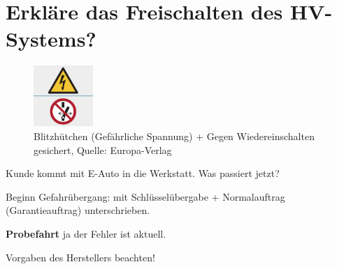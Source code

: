 \newpage

\section{Erkläre das Freischalten des
HV-Systems?}\label{erklaere-das-freischalten-des-hv-systems}

\begin{figure}[!ht]%
\centering
\includegraphics[width=0.2\textwidth]{images/HV/HV-8.pdf}
\caption{Blitzhütchen (Gefährliche Spannung) + Gegen Wiedereinschalten
gesichert, Quelle: Europa-Verlag}
\end{figure}

Kunde kommt mit E-Auto in die Werkstatt. Was passiert jetzt?

Beginn Gefahrübergang: mit Schlüsselübergabe + Normalauftrag
(Garantieauftrag) unterschrieben.

\textbf{Probefahrt} ja der Fehler ist aktuell.

Vorgaben des Herstellers beachten!

